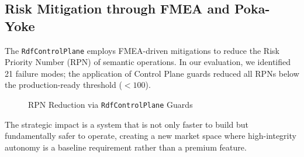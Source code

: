 \subsection{Risk Mitigation through FMEA and Poka-Yoke}

The \texttt{RdfControlPlane} employs FMEA-driven mitigations to reduce the Risk Priority Number (RPN) of semantic operations. In our evaluation, we identified 21 failure modes; the application of Control Plane guards reduced all RPNs below the production-ready threshold ($<100$).

\begin{figure}[h]
\centering
{}
\caption{RPN Reduction via \texttt{RdfControlPlane} Guards}
\end{figure}

The strategic impact is a system that is not only faster to build but fundamentally safer to operate, creating a new market space where high-integrity autonomy is a baseline requirement rather than a premium feature.
